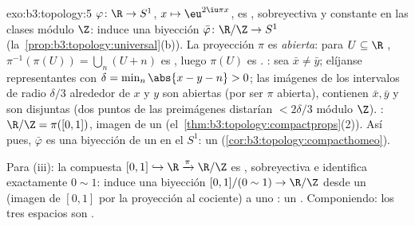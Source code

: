 \begin{solution}{exo:b3:topology:5}
$\varphi \colon \R \to S^1$, $x \mapsto \eu^{2\iu\pi x}$, es
, sobreyectiva y constante
en las clases módulo $\Z$: induce una biyección
$\bar\varphi \colon \R/\Z \to
S^1$ (la~\cref{prop:b3:topology:universal}(b)). La proyección $\pi$ es
\emph{abierta}: para $U \subseteq \R$ ,
$\pi^{-1}(\pi(U)) = \bigcup_{n}(U + n)$ es , luego $\pi(U)$ es
. : sea
$\bar x \neq \bar y$; elíjanse representantes con
$\delta = \min_{n}\abs{x - y - n} > 0$; las imágenes de los intervalos
de radio $\delta/3$ alrededor de $x$ y $y$ son abiertas (por ser $\pi$
abierta), contienen $\bar x, \bar y$ y son disjuntas (dos puntos de las
preimágenes distarían $< 2\delta/3$ módulo $\Z$).
: $\R/\Z = \pi([0,1])$, imagen
 de un
(el~\cref{thm:b3:topology:compactprops}(2)). Así pues, $\bar\varphi$ es
una biyección  de un
 en el
 $S^1$: un
(\cref{cor:b3:topology:compacthomeo}).

Para (iii): la compuesta $[0,1] \hookrightarrow \R
\xrightarrow{\pi} \R/\Z$ es
, sobreyectiva e identifica
exactamente $0 \sim 1$: induce una biyección
 $[0,1]/(0\sim1) \to \R/\Z$
desde un  (imagen
 de $[0,1]$ por la
proyección al cociente) a uno : un .
Componiendo: los tres espacios son
.
\end{solution}

